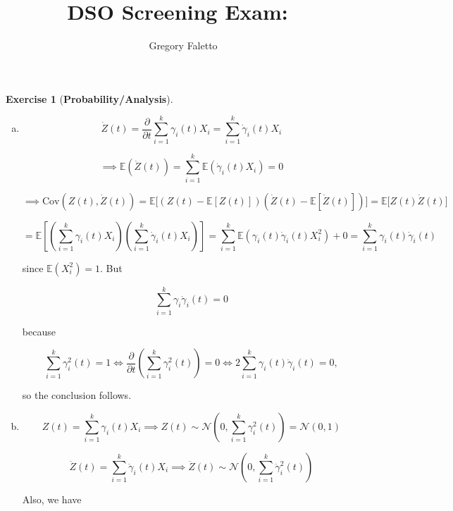 \documentclass{article}
\title{
    \vspace{2in}
    \textmd{\textbf{DSO Screening Exam:\ \hmwkTitle}}\\
    \vspace{3in}
}
\author{Gregory Faletto}
\date{}
\theoremstyle{definition}
\newtheorem{exercise}{Exercise}
\theoremstyle{definition}
\theoremstyle{definition}
\theoremstyle{definition}
\newcommand{\E}{\mathbb{E}}
\newcommand{\pderiv}[2]{\frac{\partial #1}{\partial #2}}
\newcommand{\Cov}{\mathrm{Cov}}
\newcommand\indep{\protect\mathpalette{\protect\independenT}{\perp}}
\def\independenT#1#2{\mathrel{\rlap{$#1#2$}\mkern2mu{#1#2}}}
\begin{document}
\maketitle

\pagebreak


\begin{exercise}[\textbf{Probability/Analysis}]

\begin{enumerate}[(a)]

\item

\[
\dot{Z}(t) =  \pderiv{}{t} \sum_{i=1}^k \gamma_i(t) X_i =   \sum_{i=1}^k   \dot{\gamma}_i(t) X_i 
\]

\[
\implies \E \left( \dot{Z}(t)  \right) =    \sum_{i=1}^k   \E \left( \dot{\gamma}_i(t) X_i \right) = 0
\]

\[
\implies \Cov(Z(t), \dot{Z}(t)) = \E \big[ (Z(t) - \E[ Z(t)])(\dot{Z}(t)  - \E[\dot{Z}(t) ]) \big]  = \E \big[ Z(t) \dot{Z}(t)  \big]  
\]

\[
= \E \left[  \left(  \sum_{i=1}^k \gamma_i(t) X_i   \right) \left( \sum_{i=1}^k   \dot{\gamma}_i(t) X_i  \right)  \right] = \sum_{i=1}^k \E \left( \gamma_i(t)  \dot{\gamma}_i(t)  X_i^2 \right) + 0 = \sum_{i=1}^k \gamma_i(t)  \dot{\gamma}_i(t) 
\]

since \(\E(X_i^2) = 1\). But 

\begin{equation}\label{2017.screen.1.a.deriv.id}
\sum_{i=1}^k \gamma_i \dot{\gamma}_i(t) = 0 
\end{equation}

because

\[
\sum_{i=1}^k \gamma_i^2(t) = 1 \iff  \pderiv{}{t} \left( \sum_{i=1}^k \gamma_i^2(t) \right) = 0 \iff 2 \sum_{i=1}^k \gamma_i(t) \dot{\gamma}_i(t) = 0,
\]

so the conclusion follows.

\item

\[
Z(t) =  \sum_{i=1}^k   \gamma_i(t)  X_i \implies Z(t) \sim \mathcal{N} \left(0, \sum_{i=1}^k \gamma_i^2(t)  \right) = \mathcal{N} \left(0,1 \right)
\]

\[
\ddot{Z}(t) =  \sum_{i=1}^k   \ddot{\gamma}_i(t)  X_i \implies \ddot{Z}(t) \sim \mathcal{N} \left(0, \sum_{i=1}^k \ddot{\gamma}_i^2(t)  \right)
\]

Also, we have

%


\end{enumerate}
\end{exercise}
\end{document}
